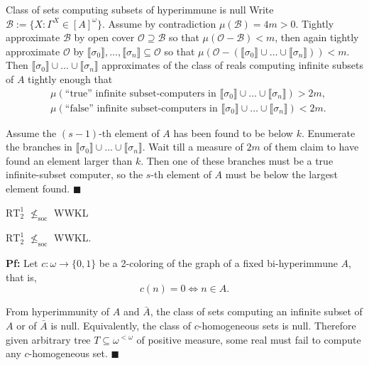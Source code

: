 \begin{frame}{Class of sets computing subsets of hyperimmune is null}
  Write $\mathcal{B} :=\{X: \Gamma^X\in[A]^\omega\}$.
  Assume by contradiction $\mu(\mathcal{B})=4m>0$. Tightly approximate
  $\mathcal{B}$ by open cover $\mathcal{O}\supseteq\mathcal{B}$ so that
  $\mu(\mathcal{O}-\mathcal{B})<m$, then again tightly approximate
  $\mathcal{O}$ by $\llbracket\sigma_0\rrbracket,
  \ldots,\llbracket\sigma_n\rrbracket \subseteq\mathcal{O}$ so
  that $\mu(\mathcal{O}-(\llbracket\sigma_0\rrbracket \cup\ldots
  \cup\llbracket\sigma_n\rrbracket)) <m$.
  Then $\llbracket\sigma_0\rrbracket \cup\ldots\cup
  \llbracket\sigma_n\rrbracket$ approximates of the class
  of reals computing infinite subsets of $A$ tightly enough that
  \begin{align*}
    &\mu(\text{``true'' infinite subset-computers in }
    \llbracket\sigma_0\rrbracket \cup\ldots\cup
    \llbracket\sigma_n\rrbracket)>2m,\\
    &\mu(\text{``false'' infinite subset-computers in }
    \llbracket\sigma_0\rrbracket \cup\ldots\cup
    \llbracket\sigma_n\rrbracket)<2m.
  \end{align*}

  Assume the $(s-1)$-th element of $A$ has been found to be below $k$.
  Enumerate the branches in $\llbracket\sigma_0\rrbracket \cup\ldots\cup
  \llbracket\sigma_n\rrbracket$.  Wait
  till a measure of $2m$ of them claim to have found an element larger than
  $k$. Then one of these branches must be a true infinite-subset computer,
  so the $s$-th element of $A$ must be below the largest element found.
  $\blacksquare$
\end{frame}

\begin{frame}{$\text{RT}_2^1$ $\nleq_{\text{soc}}$ WWKL}
  \begin{thm}
    $\text{RT}_2^1$ $\nleq_{\text{soc}}$ WWKL.
  \end{thm}

  \vspace{1em}
  \textbf{Pf:} Let $c:\omega\rightarrow\{0,1\}$ be a 2-coloring of the
  graph of a fixed bi-hyperimmune $A$, that is,
  \[c(n)=0 \Leftrightarrow n\in A.\]
  
  From hyperimmunity of $A$ and $\bar{A}$, the class of sets computing an
  infinite subset of $A$ or of $\bar{A}$ is null. Equivalently, the class
  of $c$-homogeneous sets is null. Therefore given arbitrary tree
  $T\subseteq\omega^{<\omega}$ of positive measure, some real must fail to
  compute any $c$-homogeneous set. $\blacksquare$
\end{frame}

